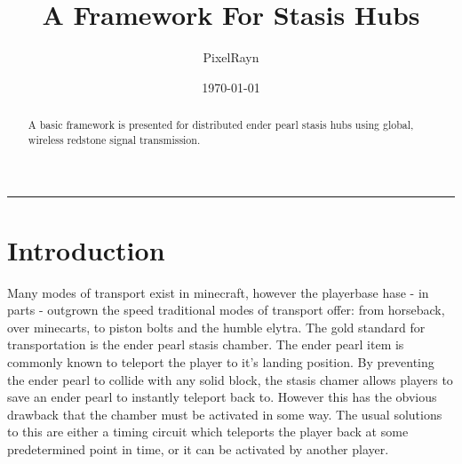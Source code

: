 \documentclass[a4paper,10pt]{article}
\title{A Framework For Stasis Hubs}
\author{PixelRayn}
\affil{Discussion at \href{https://discord.gg/N9rxV4fwnH}{\underline{TMC Research Papers (Discord)}}}
\date{\today}
\begin{document}
\maketitle

\begin{abstract}
    \vspace{1em}
    A basic framework is presented for distributed ender pearl stasis hubs using global, wireless redstone signal transmission.
\end{abstract}

\tableofcontents
\vspace{1em}
\hrule


\section{Introduction}

%
%


Many modes of transport exist in minecraft, however the playerbase hase - in parts - outgrown the speed traditional modes of transport offer: from horseback, over minecarts, to piston bolts and the humble elytra.
The gold standard for transportation is the ender pearl stasis chamber.
The ender pearl item is commonly known to teleport the player to it's landing position.
By preventing the ender pearl to collide with any solid block, the stasis chamer allows players to save an ender pearl to instantly teleport back to.
However this has the obvious drawback that the chamber must be activated in some way. The usual solutions to this are either a timing circuit which teleports the player back at some predetermined point in time, or it can be activated by another player. 
\end{document}
